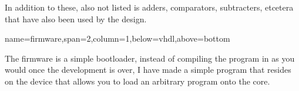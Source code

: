 \documentclass[a1paper,portrait]{baposter}
\begin{document}
\begin{poster}
{In addition to these, also not listed is adders, comparators, subtracters, etcetera 
that have also been used by the design.

% 

}

{name=firmware,span=2,column=1,below=vhdl,above=bottom}{

The firmware is a simple bootloader, instead of compiling the program in as you would
once the development is over, I have made a simple program that resides on the device
that allows you to load an arbitrary program onto the core. 

}

\end{poster}
\end{document}

